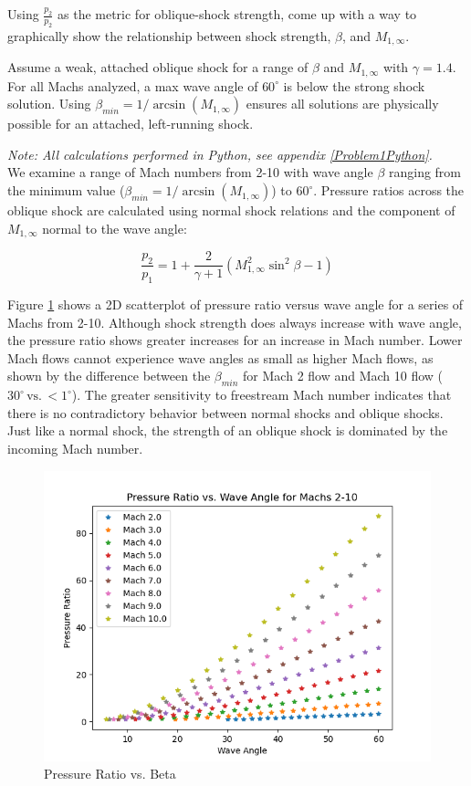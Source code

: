 \documentclass[../main.tex]{subfiles}
\begin{document}

Using \(\frac{p_2}{p_2}\) as the metric for oblique-shock strength, come up with a way to graphically show the relationship between shock strength, \(\beta\), and \(M_{1,\infty}\).

\assumptions{}
Assume a weak, attached oblique shock for a range of \(\beta\) and \(M_{1,\infty}\) with \(\gamma=1.4\).
For all Machs analyzed, a max wave angle of \(60^\circ\) is below the strong shock solution.
Using  \(\beta_{min}=1/\arcsin{(M_{1,\infty})}\) ensures all solutions are physically possible for an attached, left-running shock.

\solution{}
\textit{Note: All calculations performed in Python, see appendix \ref{Problem1Python}.}\\
We examine a range of Mach numbers from 2-10 with wave angle \(\beta\) ranging from the minimum value (\(\beta_{min}=1/\arcsin{(M_{1,\infty})}\)) to \(60^\circ\).
Pressure ratios across the oblique shock are calculated using normal shock relations and the component of \(M_{1,\infty}\) normal to the wave angle:

\[
    \frac{p_2}{p_1}
    =
    1 + \frac{2}{\gamma+1}
    \left({
    M_{1,\infty}^2 \sin^2{\beta} - 1
    }\right)
\]

Figure \ref{pr_2d} shows a 2D scatterplot of pressure ratio versus wave angle for a series of Machs from 2-10.
Although shock strength does always increase with wave angle, the pressure ratio shows greater increases for an increase in Mach number.
Lower Mach flows cannot experience wave angles as small as higher Mach flows, as shown by the difference between the \(\beta_{min}\) for Mach 2 flow and Mach 10 flow (\(30^\circ\,\textrm{vs.}\,<1^\circ\)).
The greater sensitivity to freestream Mach number indicates that there is no contradictory behavior between normal shocks and oblique shocks.
Just like a normal shock, the strength of an oblique shock is dominated by the incoming Mach number.



\begin{figure}[h!]
    \centering
    \includegraphics[scale=1.0]{../../images/problem_1/pr_vs_beta_2D.png}
    \caption{Pressure Ratio vs. Beta}
    \label{pr_2d}
\end{figure}
\end{document}
